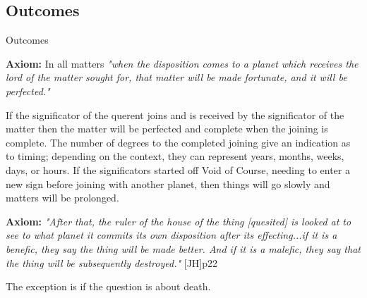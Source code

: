\subsection{Outcomes}
\begin{frame}[t]{Outcomes}
\begin{block}{}
\textbf{Axiom:} In all matters \textsl{"when the disposition comes to a planet which receives the lord of the matter sought for, that matter will be made fortunate, and it will be perfected."}
\end{block}

If the significator of the querent joins and is received by the significator of the matter then the matter will be perfected and complete when the joining is complete. The number of degrees to the completed joining give an indication as to timing; depending on the context, they can represent years, months, weeks, days, or hours. If the significators started off Void of Course, needing to enter a new sign before joining with  another planet, then things will go slowly and matters will be prolonged.

\begin{block}{}
\textbf{Axiom:} \textsl{"After that, the ruler of the house of the thing [quesited] is looked at to see to what planet it commits its own disposition after its effecting...if it is a benefic, they say the thing will be made better. And if it is a malefic, they say that the thing will be subsequently destroyed."} [JH]p22
\end{block}

The exception is if the question is about death.

\end{frame}